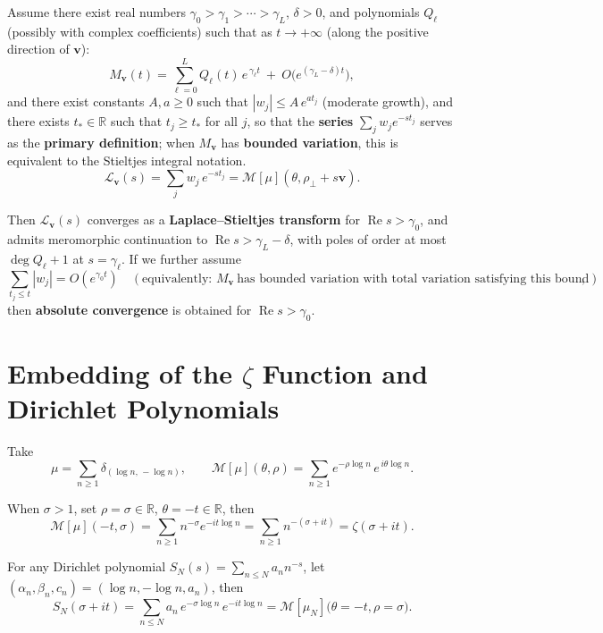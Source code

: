\documentclass[11pt,a4paper]{article}
\theoremstyle{remark}
\DeclareMathOperator{\Re}{Re}
\begin{document}
Assume there exist real numbers $\gamma_0>\gamma_1>\cdots>\gamma_L$, $\delta>0$, and polynomials $Q_\ell$ (possibly with complex coefficients) such that as $t\to+\infty$ (along the positive direction of $\mathbf v$):
\begin{equation}
M_{\mathbf v}(t)=\sum_{\ell=0}^{L} Q_\ell(t)\,e^{\,\gamma_\ell t}
\ +\ O\big(e^{(\gamma_L-\delta)t}\big),
\end{equation}
and there exist constants $A,a\ge0$ such that $|w_j|\le A\,e^{a t_j}$ (moderate growth), and there exists $t_*\in\mathbb{R}$ such that $t_j\ge t_*$ for all $j$, so that the \textbf{series} $\sum_j w_j e^{-s t_j}$ serves as the \textbf{primary definition}; when $M_{\mathbf v}$ has \textbf{bounded variation}, this is equivalent to the Stieltjes integral notation.
\begin{equation}
\mathcal{L}_{\mathbf v}(s)=\sum_j w_j\,e^{-s t_j}
=\mathcal{M}[\mu](\theta,\rho_\perp+s\mathbf v).
\end{equation}

Then $\mathcal{L}_{\mathbf v}(s)$ converges as a \textbf{Laplace--Stieltjes transform} for $\Re s>\gamma_0$, and admits meromorphic continuation to $\Re s>\gamma_L-\delta$, with poles of order at most $\deg Q_\ell+1$ at $s=\gamma_\ell$. If we further assume
\begin{equation}
\sum_{t_j\le t}|w_j|=O(e^{\gamma_0 t})\quad(\text{equivalently: }M_{\mathbf v}\ \text{has bounded variation with total variation satisfying this bound}),
\end{equation}
then \textbf{absolute convergence} is obtained for $\Re s>\gamma_0$.

\section{Embedding of the $\zeta$ Function and Dirichlet Polynomials}

Take
\begin{equation}
\mu=\sum_{n\ge1}\delta_{(\log n,\,-\log n)},\qquad
\mathcal{M}[\mu](\theta,\rho)=\sum_{n\ge1}e^{-\rho\log n}\,e^{\,i\theta\log n}.
\end{equation}

When $\sigma>1$, set $\rho=\sigma\in\mathbb{R}$, $\theta=-t\in\mathbb{R}$, then
\begin{equation}
\mathcal{M}[\mu](-t,\sigma)=\sum_{n\ge1}n^{-\sigma}e^{-it\log n}
=\sum_{n\ge1}n^{-(\sigma+it)}=\zeta(\sigma+it).
\end{equation}

For any Dirichlet polynomial $S_N(s)=\sum_{n\le N}a_n n^{-s}$, let $(\alpha_n,\beta_n,c_n)=(\log n,-\log n,a_n)$, then
\begin{equation}
S_N(\sigma+it)=\sum_{n\le N} a_n\,e^{-\sigma\log n}\,e^{-it\log n}
=\mathcal{M}[\mu_{N}]\bigl(\theta=-t,\rho=\sigma\bigr).
\end{equation}
\end{document}
